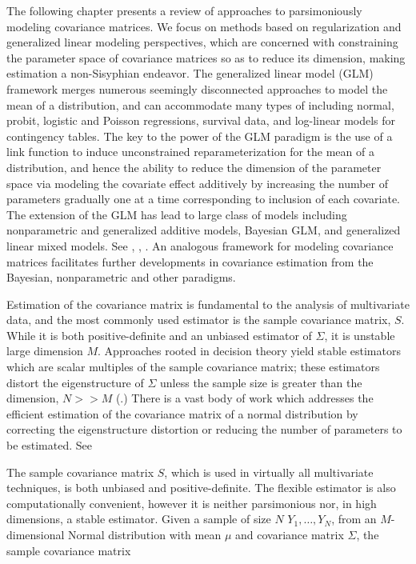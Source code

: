 \documentclass[12pt]{article}
\newcommand*\needsparaphrased{\color{red}}
\theoremstyle{definition}
\begin{document}
The following chapter presents a review of approaches to parsimoniously modeling covariance matrices. We focus on methods based on regularization and generalized linear modeling perspectives, which are concerned with constraining the parameter space of covariance matrices so as to reduce its dimension, making estimation a non-Sisyphian endeavor. The generalized linear model (GLM) framework \citet{McCullagh1989} merges numerous seemingly disconnected approaches to model the mean of a distribution, and can accommodate many types of including normal, probit, logistic and Poisson regressions, survival data, and log-linear models for contingency tables. The key to the power of the GLM paradigm is the use of a link function to induce unconstrained reparameterization for the mean of a distribution, and hence the ability to reduce the dimension of the parameter space via modeling the
covariate effect additively by increasing the number of parameters gradually one at a time corresponding to inclusion of each covariate. The extension of the GLM has lead to large class of models including nonparametric and generalized additive models, Bayesian GLM, and generalized linear mixed models. See \citet{hastie1990generalized},  \citet{dey2000generalized},  \citet{mcculloch2001generalized}. An analogous framework for modeling covariance matrices facilitates further developments in covariance estimation from the Bayesian, nonparametric and other paradigms.

\bigskip

Estimation of the covariance matrix is fundamental to the analysis of multivariate data, and the most commonly used estimator is the sample covariance matrix, $S$. While it is both positive-definite and an unbiased estimator of $\Sigma$, it is unstable large dimension $M$. Approaches rooted in decision theory yield stable estimators which are scalar multiples of the sample covariance matrix; these estimators distort the eigenstructure of $\Sigma$ unless the sample size is greater than the dimension, $N >> M$ (\citet{dempster1972covariance}.)  There is a vast body of work which addresses the efficient estimation of the covariance matrix of a normal distribution by correcting the eigenstructure distortion or reducing the number of parameters to be estimated. See \citet{stein1975estimation}{\needsparaphrased{ Lin and Perlman, 1985; Yang and Berger, 1994; Daniels and Kass, 1999; Champion, 2003; Wong, Carter and}} 

\bigskip

The sample covariance matrix $S$, which is used in virtually all multivariate techniques, is both unbiased and positive-definite. The flexible estimator is also computationally convenient, however it is neither parsimonious nor, in high dimensions, a stable estimator. Given a sample of size $N$ $Y_1,\dots , Y_N$, from an $M$-dimensional Normal distribution with mean $\mu$ and covariance matrix $\Sigma$, the sample covariance matrix
\end{document}
